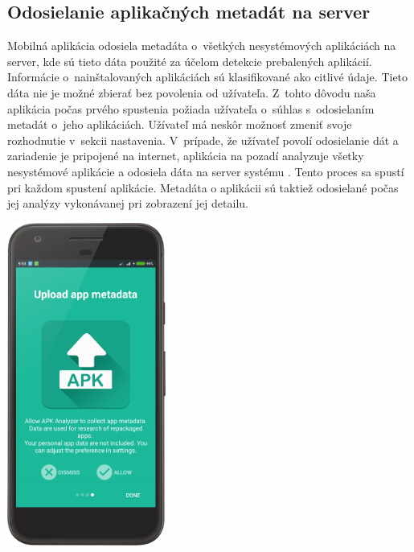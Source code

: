 \subsection{Odosielanie aplikačných metadát na server}
\begin{minipage}[H] {\textwidth}
\begin{minipage}[t]{0.48\textwidth}
Mobilná aplikácia odosiela metadáta o~všetkých nesystémových aplikáciách na server, kde sú tieto dáta použité za účelom detekcie prebalených aplikácií.
Informácie o~nainštalovaných aplikáciách sú klasifikované ako citlivé údaje. Tieto dáta nie je možné zbierať bez povolenia od užívateľa. Z~tohto dôvodu naša aplikácia počas prvého spustenia požiada užívateľa o~súhlas s~odosielaním metadát o~jeho aplikáciách. Užívateľ má neskôr možnosť zmeniť svoje rozhodnutie v~sekcii nastavenia.
V~prípade, že užívateľ povolí odosielanie dát a zariadenie je pripojené na internet, aplikácia na pozadí analyzuje všetky nesystémové aplikácie a odosiela dáta na server systému . Tento proces sa spustí pri každom spustení aplikácie. Metadáta o aplikácii sú taktiež odosielané počas jej analýzy vykonávanej pri zobrazení jej detailu. 
\end{minipage}%
\hfill
\centering
\begin{minipage}[t][][b]{0.45\textwidth}
\centering
    \includegraphics[width=5.2cm]{images/app/upload_device.png}
\centering
{}
\label{fig:upload-dialog}
\end{minipage}%
\end{minipage}

